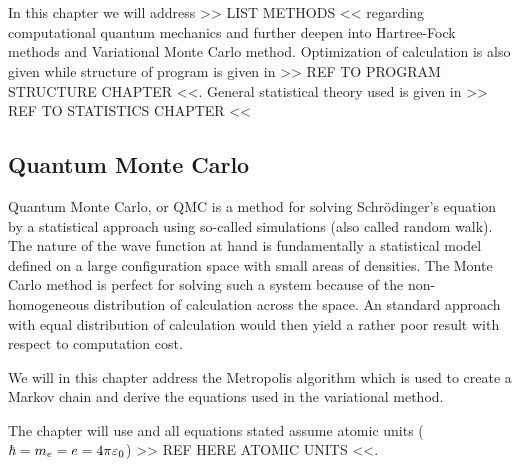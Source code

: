\chapter{\label{chapter:4}}
    In this chapter we will address >> LIST METHODS << regarding computational
    quantum mechanics and further deepen into Hartree-Fock methods and
    Variational Monte Carlo method. Optimization of calculation is also given
    while structure of program is given in >> REF TO PROGRAM STRUCTURE CHAPTER
    <<. General statistical theory used is given in >> REF TO STATISTICS CHAPTER <<

\section{Quantum Monte Carlo\label{sec:QMC}}
    Quantum Monte Carlo, or QMC is a method for solving Schrödinger's equation
    by a statistical approach using so-called  simulations
    (also called random walk). The nature of the wave function at hand is
    fundamentally a statistical model defined on a large configuration space
    with small areas of densities. The Monte Carlo method is perfect for
    solving such a system because of the non-homogeneous distribution of
    calculation across the space. An standard approach with equal distribution
    of calculation would then yield a rather poor result with respect to
    computation cost.

    We will in this chapter address the Metropolis algorithm which is used to
    create a Markov chain and derive the equations used in the variational
    method.

    The chapter will use  \cite{GriffQuan} and all
    equations stated assume atomic units ($\hbar=m_e=e=4\pi\varepsilon_0$) >> REF
    HERE ATOMIC UNITS <<.

